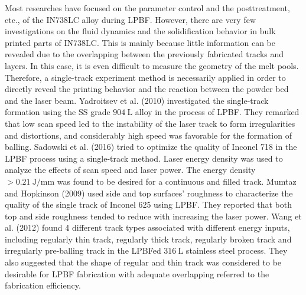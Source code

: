 \documentclass[10pt]{article}
\begin{document}
Most researches have focused on the parameter control and the posttreatment, etc., of the IN738LC alloy during LPBF. However, there are very few investigations on the fluid dynamics and the solidification behavior in bulk printed parts of IN738LC. This is mainly because little information can be revealed due to the overlapping between the previously fabricated tracks and layers. In this case, it is even difficult to measure the geometry of the melt pools. Therefore, a single-track experiment method is necessarily applied in order to directly reveal the printing behavior and the reaction between the powder bed and the laser beam. Yadroitsev et al. (2010) investigated the single-track formation using the SS grade $904 \mathrm{~L}$ alloy in the process of LPBF. They remarked that low scan speed led to the instability of the laser track to form irregularities and distortions, and considerably high speed was favorable for the formation of balling. Sadowski et al. (2016) tried to optimize the quality of Inconel 718 in the LPBF process using a single-track method. Laser energy density was used to analyze the effects of scan speed and laser power. The energy density $>0.21 \mathrm{~J} / \mathrm{mm}$ was found to be desired for a continuous and filled track. Mumtaz and Hopkinson (2009) used side and top surfaces' roughness to characterize the quality of the single track of Inconel 625 using LPBF. They reported that both top and side roughness tended to reduce with increasing the laser power. Wang et al. (2012) found 4 different track types associated with different energy inputs, including regularly thin track, regularly thick track, regularly broken track and irregularly pre-balling track in the LPBFed $316 \mathrm{~L}$ stainless steel process. They also suggested that the shape of regular and thin track was considered to be desirable for LPBF fabrication with adequate overlapping referred to the fabrication efficiency.
\end{document}
